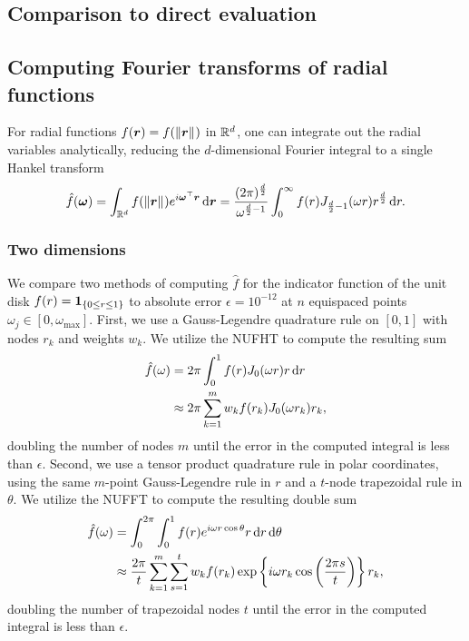 \subsection{Comparison to direct evaluation}


\subsection{Computing Fourier transforms of radial functions}

For radial functions $f(\bm{r}) = f(\left\Vert\bm{r}\right\Vert_{})$ in $\mathbb{R}^d$, one can integrate
out the radial variables analytically, reducing the $d$-dimensional Fourier
integral to a single Hankel transform
\begin{align} \label{eq:radial-fourier}
    \hat{f}(\bm{\omega}) 
    = \int_{\R^d} f(\norm{\bm{r}}) e^{i\bm{\omega}^\top \bm{r}} \dif{\bm{r}}
    = \frac{(2\pi)^{\frac{d}{2}}}{\omega^{\frac{d}{2} - 1}} \int_0^\infty f(r) J_{\frac{d}{2} - 1}(\omega r) r^{\frac{d}{2}} \dif{r}.
\end{align}

\subsubsection{Two dimensions}

We compare two methods of computing $\hat{f}$ for the indicator function of the
unit disk $f(r) = \bm{1}_{\left\{ 0 \leq r \leq 1\right\}}$ to absolute error $\epsilon = 10^{-12}$
at $n$ equispaced points $\omega_j \in [0, \omega_{\text{max}}]$. First, we use
a Gauss-Legendre quadrature rule on $[0,1]$ with nodes $r_k$ and weights $w_k$.
We utilize the NUFHT to compute the resulting sum
\begin{align}
  \hat{f}(\omega) 
  &= 2\pi\int_0^1 f(r) J_0(\omega r) r \mathop{}\!\mathrm{d}{r} \\
  &\approx 2\pi \sum_{k=1}^m w_k f(r_k) J_0(\omega r_k) r_k,
\end{align}
doubling the number of nodes $m$ until the error in the computed integral is
less than $\epsilon$. Second, we use a tensor product quadrature rule in polar
coordinates, using the same $m$-point Gauss-Legendre rule in $r$ and a $t$-node
trapezoidal rule in $\theta$. We utilize the NUFFT to compute the resulting
double sum
\begin{align}
  \hat{f}(\omega) 
  &= \int_0^{2\pi} \int_0^1 f(r) e^{i\omega r\cos\theta} r \mathop{}\!\mathrm{d}{r} \mathop{}\!\mathrm{d}{\theta} \\
  &\approx \frac{2\pi}{t} \sum_{k=1}^{m} \sum_{s=1}^{t} w_k f(r_k) \exp\left\{i\omega r_k\cos\left(\frac{2\pi s}{t}\right)\right\} r_k,
\end{align}
doubling the number of trapezoidal nodes $t$ until the error in the computed
integral is less than $\epsilon$.

